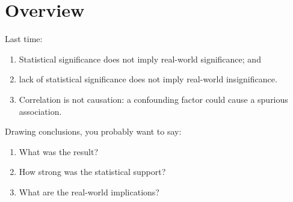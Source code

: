 %
%
%



\subtitle{and nonparametric testing}

\date{22 October 2015}





\begin{frame}
  \maketitle
\end{frame}


\section*{Overview}

\begin{frame}{Last time:}

  \begin{enumerate}
      \item Statistical significance does not imply real-world significance; and
      \item lack of statistical significance does not imply real-world insignificance.
      \item Correlation is not causation: a confounding factor could cause a spurious association.
  \end{enumerate}

  \vspace{2em}

  Drawing conclusions, you probably want to say:
    \begin{enumerate}
        \item What was the result?
        \item How strong was the statistical support?
        \item What are the real-world implications?
    \end{enumerate}


\end{frame}

